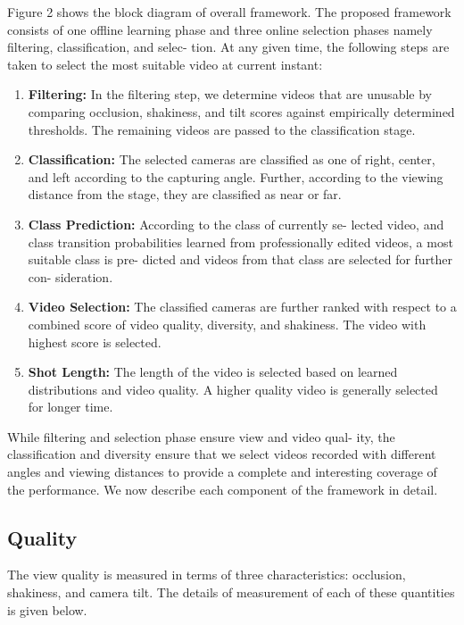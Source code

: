 \documentclass{sig-alternate}
\providecommand{\DIFadd}[1]{{\protect\color{blue}\uwave{#1}}} %
\providecommand{\DIFaddbegin}{} %
\providecommand{\DIFaddend}{} %
\begin{document}
Figure 2 shows the block diagram of overall framework. The
proposed framework consists of one offline learning phase and three
online selection phases namely filtering, classification, and selec-
tion. At any given time, the following steps are taken to select the
most suitable video at current instant:
 \begin{enumerate} 
\item \textbf{Filtering:} In the filtering step, we determine videos that are
unusable by comparing occlusion, shakiness, and tilt scores
against empirically determined thresholds. The remaining
videos are passed to the classification stage.
\item \textbf{Classification:} The selected cameras are classified as one
of right, center, and left according to the capturing angle.
Further, according to the viewing distance from the stage,
they are classified as near or far.
\item \textbf{Class Prediction:} According to the class of currently se-
lected video, and class transition probabilities learned from
professionally edited videos, a most suitable class is pre-
dicted and videos from that class are selected for further con-
sideration.
\item \textbf{Video Selection:} The classified cameras are further ranked
with respect to a combined score of video quality, diversity,
and shakiness. The video with highest score is selected.
\item \textbf{Shot Length:} The length of the video is selected based on
learned distributions and video quality. A higher quality video
is generally selected for longer time.
 \end{enumerate} 

While filtering and selection phase ensure view and video qual-
ity, the classification and diversity ensure that we select videos
recorded with different angles and viewing distances to provide a
complete and interesting coverage of the performance. We now
describe each component of the framework in detail.

\subsection{Quality}
\DIFaddbegin \DIFadd{I am a new sentence.
}\DIFaddend The view quality is measured in terms of three characteristics:
occlusion, shakiness, and camera tilt. The details of measurement
of each of these quantities is given below.
\end{document}
